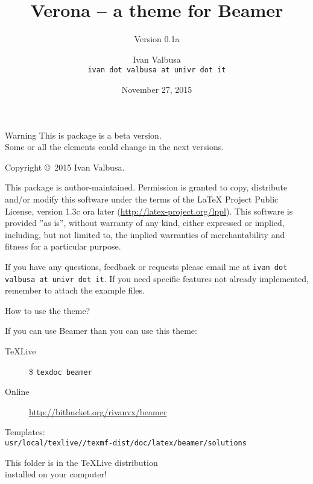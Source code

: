 \documentclass[10pt]{beamer}
\title{Verona -- a theme for Beamer}
\subtitle{Version 0.1a}
\author[Ivan Valbusa]{Ivan Valbusa\texorpdfstring{\\}{}\scriptsize\texttt{ivan dot valbusa at univr dot it}}
\institute[University of Verona]{Department of Philology, Literature, and Linguistics\\
University of Verona}
\date{November 27, 2015}
\begin{document}
\begin{frame}[plain]
\titlepage
\end{frame}
\begin{frame}[b,plain]

\begin{alertblock}{Warning}
This is package is a beta version.\\
Some or all the elements could change in the next versions.
\end{alertblock}

\vfill

\color{gray}
\small
\noindent Copyright \copyright\ 2015 Ivan Valbusa.
 \bigskip

\noindent This package is author-maintained. 
Permission is granted to copy, distribute and/or modify this software under the 
terms of the LaTeX Project Public License, version 1.3c ora later (\url{http://latex-project.org/lppl}). This software is provided ''as is'', without warranty of any kind, either expressed or implied, including, but not limited to, the implied warranties of merchantability and fitness for a particular purpose.

 \bigskip
 
\noindent If you have any questions, feedback or requests please email me at \texttt{ivan dot valbusa at univr dot it}. If you need specific features not already implemented, remember to attach the example files.

\bigskip

\end{frame}
\begin{frame}{How to use the theme?}

If you can use Beamer than you can use this theme:
\begin{description}
\item[\TeX Live] \$ \alert{\texttt{texdoc beamer}}
\item[Online] \url{http://bitbucket.org/rivanvx/beamer}
\end{description}

\bigskip

Templates:\\
\alert{\texttt{usr/local/texlive/\the\year/texmf-dist/doc/latex/beamer/solutions} }

\smallskip

This folder is in the \TeX Live distribution\\
installed on your computer!
\end{frame}
\end{document}
